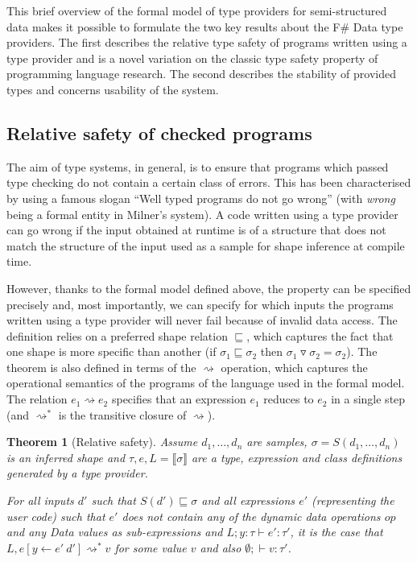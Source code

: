 \documentclass[fleqn,11pt]{report}
\newcommand{\ident}[1]{\textnormal{\ttfamily #1}}
\newtheorem{theorem}{Theorem}
\theoremstyle{definition}
\newcommand{\reduce}{\rightsquigarrow}
\newcommand{\sem}[1]{\llbracket #1 \rrbracket}
\newcommand{\semalt}[1]{S(#1)}
\begin{document}
This brief overview of the formal model of type providers for semi-structured data makes it possible
to formulate the two key results about the F\# Data type providers. The first describes the relative
type safety of programs written using a type provider and is a novel variation on the classic
type safety property of programming language research. The second describes the
stability of provided types and concerns usability of the system.

\subsection{Relative safety of checked programs}

The aim of type systems, in general, is to ensure that programs which passed type checking do not
contain a certain class of errors. This has been characterised by \citet{milner-1978-gowrong}
using a famous slogan ``Well typed programs do not go wrong'' (with \textit{wrong} being a formal
entity in Milner's system). A code written using a type provider can go wrong if the
input obtained at runtime is of a structure that does not match the structure of the input used
as a sample for shape inference at compile time.

However, thanks to the formal model defined above, the property can be specified precisely and,
most importantly, we can specify for which inputs the programs written using a type provider will
never fail because of invalid data access. The definition relies on a preferred shape relation
$\sqsubseteq$, which captures the fact that one shape is more specific than another (if
$\sigma_1 \sqsubseteq \sigma_2$ then $\sigma_1 \triangledown \sigma_2 = \sigma_2$).
%
The theorem is also defined in terms of the $\reduce$ operation, which captures the operational
semantics of the programs of the language used in the formal model. The relation $e_1 \reduce e_2$
specifies that an expression $e_1$ reduces to $e_2$ in a single step (and $\reduce^{*}$ is the
transitive closure of $\reduce$).

\begin{theorem}[Relative safety]
\label{thm:safety}
Assume $d_1, \ldots, d_n$ are samples, $\sigma=\semalt{d_1, \ldots, d_n}$ is an inferred
shape and $\tau,e,L = \sem{\sigma}$ are a type, expression and class definitions generated by a
type provider.

For all inputs $d'$ such that $\semalt{d'} \sqsubseteq \sigma$ and all expressions $e'$
(representing the user code) such that $e'$ does not contain any of the dynamic data operations $op$
and any \ident{Data} values as sub-expressions and $L; y\!:\!\tau \vdash e'\!:\!\tau'$, it is
the case that $L, e[y\leftarrow e'~d'] \reduce^{*} v$ for some value $v$ and
also $\emptyset; \vdash v : \tau'$.
\end{theorem}
\vspace{-0.2em}
\end{document}
